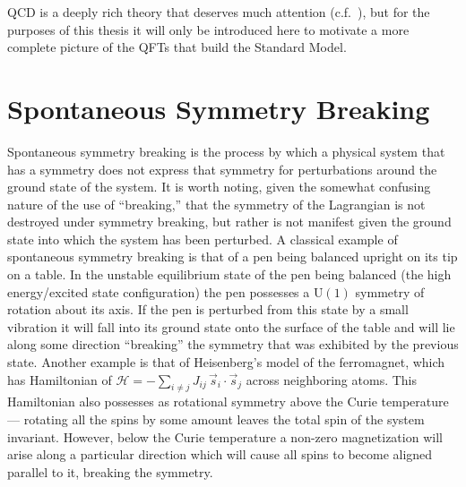 QCD is a deeply rich theory that deserves much attention (c.f.~\cite{Campbell:2017hsr}), but for the purposes of this thesis it will only be introduced here to motivate a more complete picture of the QFTs that build the Standard Model.

\section{Spontaneous Symmetry Breaking}\label{section:symmetry_breaking}

Spontaneous symmetry breaking is the process by which a physical system that has a symmetry does not express that symmetry for perturbations around the ground state of the system.
It is worth noting, given the somewhat confusing nature of the use of ``breaking,'' that the symmetry of the Lagrangian is not destroyed under symmetry breaking, but rather is not manifest given the ground state into which the system has been perturbed.
A classical example of spontaneous symmetry breaking is that of a pen being balanced upright on its tip on a table.
In the unstable equilibrium state of the pen being balanced (the high energy/excited state configuration) the pen possesses a $\mathrm{U}(1)$ symmetry of rotation about its axis.
If the pen is perturbed from this state by a small vibration it will fall into its ground state onto the surface of the table and will lie along some direction ``breaking'' the symmetry that was exhibited by the previous state.
Another example is that of Heisenberg’s model of the ferromagnet, which has Hamiltonian of $\mathcal{H} = -\sum_{i\neq j} J_{ij}\,\vec{s}_{i} \cdot \vec{s}_{j}$ across neighboring atoms.
This Hamiltonian also possesses as rotational symmetry above the Curie temperature --- rotating all the spins by some amount leaves the total spin of the system invariant.
However, below the Curie temperature a non-zero magnetization will arise along a particular direction which will cause all spins to become aligned parallel to it, breaking the symmetry.

